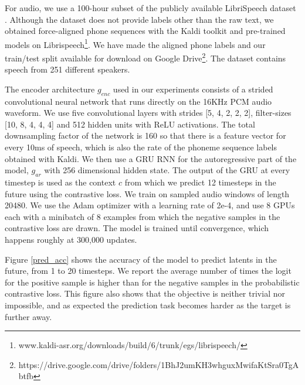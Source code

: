 For audio, we use a 100-hour subset of the publicly available LibriSpeech dataset \cite{panayotov2015librispeech}. Although the dataset does not provide labels other than the raw text, we obtained force-aligned phone sequences with the Kaldi toolkit \cite{povey2011kaldi} and pre-trained models on Librispeech\footnote{www.kaldi-asr.org/downloads/build/6/trunk/egs/librispeech/}. We have made the aligned phone labels and our train/test split available for download on Google Drive\footnote{https://drive.google.com/drive/folders/1BhJ2umKH3whguxMwifaKtSra0TgAbtfb}.
The dataset contains speech from 251 different speakers.

The encoder architecture $g_{enc}$ used in our experiments consists of a strided convolutional neural network that runs directly on the 16KHz PCM audio waveform. We use five convolutional layers with strides [5, 4, 2, 2, 2], filter-sizes [10, 8, 4, 4, 4] and 512 hidden units with ReLU activations. The total downsampling factor of the network is 160 so that there is a feature vector for every 10ms of speech, which is also the rate of the phoneme sequence labels obtained with Kaldi. We then use a GRU RNN \cite{cho2014learning} for the autoregressive part of the model, $g_{ar}$ with 256 dimensional hidden state. The output of the GRU at every timestep is used as the context $c$ from which we predict 12 timesteps in the future using the contrastive loss. We train on sampled audio windows of length 20480. We use the Adam optimizer \cite{kingma2014adam} with a learning rate of 2e-4, and use 8 GPUs each with a minibatch of 8 examples from which the negative samples in the contrastive loss are drawn. The model is trained until convergence, which happens roughly at 300,000 updates.

Figure \ref{pred_acc} shows the accuracy of the model to predict latents in the future, from 1 to 20 timesteps. We report the average number of times the logit for the positive sample is higher than for the negative samples in the probabilistic contrastive loss. This figure also shows that the objective is neither trivial nor impossible, and as expected the prediction task becomes harder as the target is further away.


